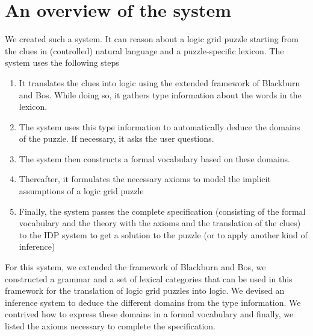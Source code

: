 \section{An overview of the system}
\label{sec:system}
We created such a system. It can reason about a logic grid puzzle starting from the clues in (controlled) natural language and a puzzle-specific lexicon. The system uses the following steps
\begin{enumerate}
  \item It translates the clues into logic using the extended framework of Blackburn and Bos. While doing so, it gathers type information about the words in the lexicon.
  \item The system uses this type information to automatically deduce the domains of the puzzle. If necessary, it asks the user questions.
  \item The system then constructs a formal vocabulary based on these domains.
  \item Thereafter, it formulates the necessary axioms to model the implicit assumptions of a logic grid puzzle
  \item Finally, the system passes the complete specification (consisting of the formal vocabulary and the theory with the axioms and the translation of the clues) to the IDP system \cite{IDP} to get a solution to the puzzle (or to apply another kind of inference)
\end{enumerate}

For this system, we extended the framework of Blackburn and Bos, we constructed a grammar and a set of lexical categories that can be used in this framework for the translation of logic grid puzzles into logic. We devised an inference system to deduce the different domains from the type information. We contrived how to express these domains in a formal vocabulary and finally, we listed the axioms necessary to complete the specification.



